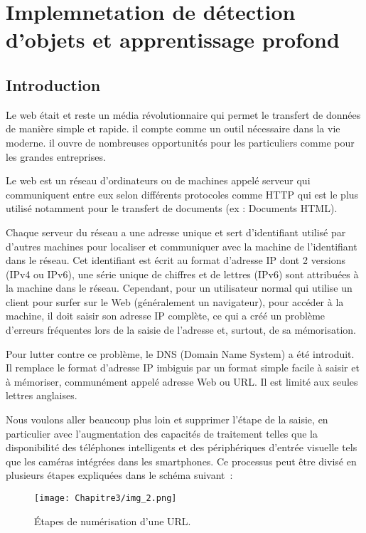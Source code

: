 \chapter{Implemnetation de détection d'objets et apprentissage profond}
\newpage
\pagestyle{fancy}
\fancyhead[L]{\chaptername \ \thechapter}
\renewcommand{\headrulewidth}{1pt}
\fancyfoot[C]{\thepage}

\section{Introduction} 
     Le web était et reste un média révolutionnaire qui permet le transfert de données de manière simple et rapide. il compte comme un outil nécessaire dans la vie moderne. il ouvre de nombreuses opportunités pour les particuliers comme pour les grandes entreprises.

     Le web est un réseau d'ordinateurs ou de machines appelé serveur qui communiquent entre eux selon différents protocoles comme HTTP qui est le plus utilisé notamment pour le transfert de documents (ex : Documents HTML).

     Chaque serveur du réseau a une adresse unique et sert d'identifiant utilisé par d'autres machines pour localiser et communiquer avec la machine de l'identifiant dans le réseau. Cet identifiant est écrit au format d'adresse IP dont 2 versions (IPv4 ou IPv6), une série unique de chiffres et de lettres (IPv6) sont attribuées à la machine dans le réseau. Cependant, pour un utilisateur normal qui utilise un client pour surfer sur le Web (généralement un navigateur), pour accéder à la machine, il doit saisir son adresse IP complète, ce qui a créé un problème d'erreurs fréquentes lors de la saisie de l'adresse et, surtout, de sa mémorisation.

     Pour lutter contre ce problème, le DNS (Domain Name System) a été introduit. Il remplace le format d'adresse IP imbiguis par un format simple facile à saisir et à mémoriser, communément appelé adresse Web ou URL. Il est limité aux seules lettres anglaises.

     Nous voulons aller beaucoup plus loin et supprimer l'étape de la saisie, en particulier avec l'augmentation des capacités de traitement telles que la disponibilité des téléphones intelligents et des périphériques d'entrée visuelle tels que les caméras intégrées dans les smartphones. Ce processus peut être divisé en plusieurs étapes expliquées dans le schéma suivant :
     \begin{figure}[H]
          \centering
          \texttt{[image: Chapitre3/img\_2.png]}
          \caption{Étapes de numérisation d'une URL.}
          \label{img2}
          \end{figure}

